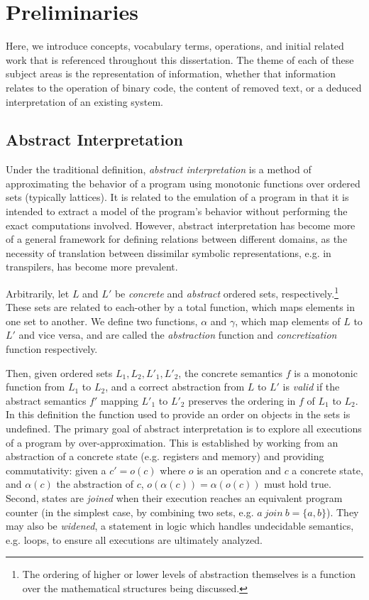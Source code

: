 \chapter{Preliminaries}
\label{chap:prelim}

Here, we introduce concepts, vocabulary terms, operations, and initial related work that is referenced throughout this dissertation.
The theme of each of these subject areas is the representation of information, whether that information relates to the operation of binary code, the content of removed text, or a deduced interpretation of an existing system.

\section{Abstract Interpretation}

Under the traditional definition, \emph{abstract interpretation} is a method of approximating the behavior of a program using monotonic functions over ordered sets (typically lattices).
It is related to the emulation of a program in that it is intended to extract a model of the program's behavior without performing the exact computations involved.
However, abstract interpretation has become more of a general framework for defining relations between different domains, as the necessity of translation between dissimilar symbolic representations, e.g. in transpilers, has become more prevalent.

Arbitrarily, let $L$ and $L'$ be \emph{concrete} and \emph{abstract} ordered sets, respectively.\footnote{The ordering of higher or lower levels of abstraction themselves is a function over the mathematical structures being discussed.}
These sets are related to each-other by a total function, which maps elements in one set to another.
We define two functions, $\alpha$ and $\gamma$, which map elements of $L$ to $L'$ and vice versa, and are called the \emph{abstraction} function and \emph{concretization} function respectively.

Then, given ordered sets $L_{1}, L_{2}, L'_{1}, L'_{2}$, the concrete semantics $f$ is a monotonic function from $L_{1}$ to $L_{2}$, and a correct abstraction from $L$ to $L'$ is \emph{valid} if the abstract semantics $f'$ mapping $L'_{1}$ to $L'_{2}$ preserves the ordering in $f$ of $L_{1}$ to $L_{2}$.
In this definition the function used to provide an order on objects in the sets is undefined.
The primary goal of abstract interpretation is to explore all executions of a program by over-approximation.
This is established by working from an abstraction of a concrete state (e.g. registers and memory) and providing commutativity: given a $c' = o(c)$ where $o$ is an operation and $c$ a concrete state, and $\alpha(c)$ the abstraction of $c$, $o(\alpha(c)) = \alpha(o(c))$ must hold true.
Second, states are \emph{joined} when their execution reaches an equivalent program counter (in the simplest case, by combining two sets, e.g. $a\ join\ b = \{a,b\}$).
They may also be \emph{widened}, a statement in logic which handles undecidable semantics, e.g. loops, to ensure all executions are ultimately analyzed.

